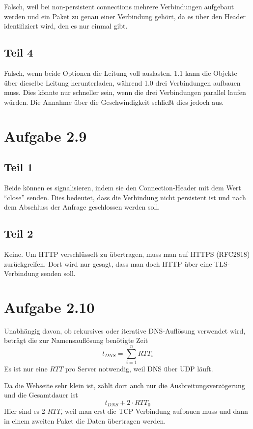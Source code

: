 \documentclass[10pt,a4paper]{article}
\begin{document}
Falsch, weil bei non-persistent connections mehrere Verbindungen aufgebaut
werden und ein Paket zu genau einer Verbindung gehört, da es über den Header
identifiziert wird, den es nur einmal gibt.

\subsection{Teil 4}

Falsch, wenn beide Optionen die Leitung voll auslasten. 1.1 kann die Objekte
über dieselbe Leitung herunterladen, während 1.0 drei Verbindungen aufbauen
muss. Dies könnte nur schneller sein, wenn die drei Verbindungen parallel laufen
würden. Die Annahme über die Geschwindigkeit schließt dies jedoch aus.

\section{Aufgabe 2.9}

\subsection{Teil 1}

Beide können es signalisieren, indem sie den Connection-Header mit dem Wert
``close'' senden. Dies bedeutet, dass die Verbindung nicht persistent ist und
nach dem Abschluss der Anfrage geschlossen werden soll.

\subsection{Teil 2}

Keine. Um HTTP verschlüsselt zu übertragen, muss man auf HTTPS (RFC2818)
zurückgreifen. Dort wird nur gesagt, dass man doch HTTP über eine TLS-Verbindung
senden soll.

\section{Aufgabe 2.10}

Unabhängig davon, ob rekursives oder iterative DNS-Auflösung verwendet wird,
beträgt die zur Namensauflösung benötigte Zeit
\begin{equation}
  t_{DNS} = \sum_{i = 1}^{n} RTT_{i}
\end{equation}
Es ist nur eine $RTT$ pro Server notwendig, weil DNS über UDP läuft.

Da die Webseite sehr klein ist, zählt dort auch nur die Ausbreitungsverzögerung
und die Gesamtdauer ist
\begin{equation}
  t_{DNS} + 2 \cdot RTT_{0}
\end{equation}
Hier sind es 2 $RTT$, weil man erst die TCP-Verbindung aufbauen muss und dann in
einem zweiten Paket die Daten übertragen werden.
\end{document}
